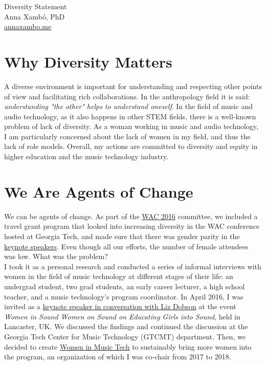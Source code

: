 \documentclass[10pt, a4paper]{article}
\begin{document}
{\LARGE Diversity Statement}\\[0.2cm]
Anna Xambó, PhD\\
\href{http://annaxambo.me}{annaxambo.me}

\section*{Why Diversity Matters}

A diverse environment is important for understanding and respecting other points of view and facilitating rich collaborations. In the anthropology field it is said: \emph{understanding "the other" helps to understand oneself}. In the field of music and audio technology, as it also happens in other STEM fields, there is a well-known problem of lack of diversity. As a woman working in music and audio technology, I am particularly concerned about the lack of women in my field, and thus the lack of role models. Overall, my actions are committed to diversity and equity in higher education and the music technology industry.

\section*{We Are Agents of Change}

We can be agents of change. As part of the \href{http://webaudio.gatech.edu/}{WAC 2016} committee, we included a travel grant program that looked into increasing diversity in the WAC conference hosted at Georgia Tech, and made sure that there was gender parity in the \href{http://webaudio.gatech.edu/keynotes}{keynote speakers}. Even though all our efforts, the number of female attendees was low. What was the problem?\\

I took it as a personal research and conducted a series of informal interviews with women in the field of music technology at different stages of their life: an undergrad student, two grad students, an early career lecturer, a high school teacher, and a music technology's program coordinator. In April 2016, I was invited as a \href{http://wiswos.bitbucket.org/index.html\%3Fp=435.html}{keynote speaker in conversation with Liz Dobson} at the event \emph{Women in Sound Women on Sound on Educating Girls into Sound}, held in Lancaster, UK. We discussed the findings and continued the discussion at the Georgia Tech Center for Music Technology (GTCMT) department. Then, we decided to create \href{http://www.gtcmt.gatech.edu/}{Women in Music Tech} to sustainably bring more women into the program, an organization of which I was co-chair from 2017 to 2018.
\end{document}
